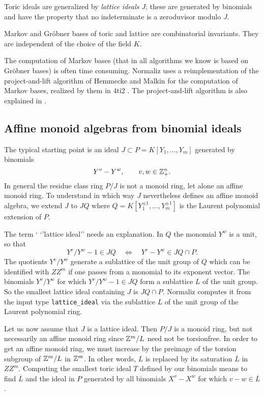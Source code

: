 Toric ideals are  generalized by \emph{lattice ideals} $J$; these are  generated by binomials and have the property that no indeterminate is a zeroduvisor modulo $J$.

Markov and Gröbner bases of toric and lattice are combinatorial invariants. They are independent of the choice of the field $K$.

The computation of Markov bases (that in all algorithms we know is based on Gröbner bases) is often time consuming. Normaliz uses a reimplementation of the project-and-lift algorithm of Hemmecke and Malkin \cite{HM} for the computation of Markov bases, realized by them in 4ti2 \cite{4ti2}. The project-and-lift algorithm is also explained in \cite{DLHK}.

\subsection{Affine monoid algebras from binomial ideals}\label{binomials}

The typical starting point is an ideal $J\subset
P=K[Y_1,\dots,Y_m]$ generated by binomials
$$
Y^v - Y^w, \qquad v,w \in {\mathbb Z}_+^n.
$$
In general the residue class ring $P/J$ is not a monoid ring, let alone an affine monoid ring. To understand in which way $J$ nevertheless defines an affine monoid algebra, we extend $J$ to $JQ$ where $Q= K[Y_1^{\pm1},\dots,Y_m^{\pm1}]$ is the Laurent polynomial extension of $P$.

The term ` `'lattice ideal'' needs an explanation. In $Q$ the monomial $Y^w$ is a unit, so that 
$$
Y^v/Y^w - 1 \in JQ \quad \iff \quad Y^v - Y^w\in JQ\cap P.
$$
The quotients $Y^v/Y^w$ generate a sublattice of the unit group of $Q$ which can be identified with $ZZ^m$ if one passes from a monomial to its exponent vector. The binomials $Y^v/Y^w$ for which $Y^v/Y^w - 1 \in JQ$ form a sublattice $L$ of the unit group. So the smallest lattice ideal containing $J$ is $JQ\cap P$. Normaliz computes it from the input type  \verb|lattice_ideal| via the sublattice $L$ of the unit group of the Laurent polynomial ring.

Let us now assume that $J$ is a lattice ideal. Then $P/J$ is a monoid ring, but not necessarily an affine monoid ring since ${\mathbb Z}^m/L$ need not be torsionfree. In order to get an affine monoid ring, we must increase by the preimage of the torsion subgroup of ${\mathbb Z}^m/L$ in ${\mathbb Z}^m$. In other words, $L$ is replaced by its saturation $\overline L$ in $ZZ^m$. Computing the smallest toric ideal $T$ defined by our binomials means to find $\overline L$ and the ideal in $P$ generated by all binomials $X^v-X^w$ for which $v-w\in \overline L$.

